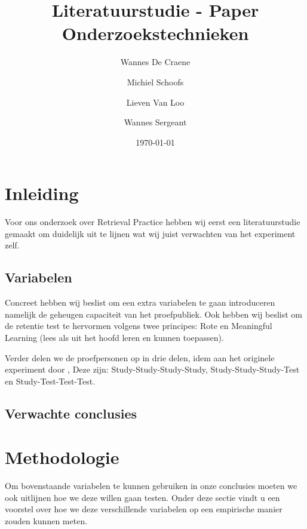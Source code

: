 \documentclass[12pt,a4paper]{article}
\author{Wannes {De Craene} \and Michiel Schoofs \and Lieven {Van Loo} \and Wannes Sergeant}
\title{Literatuurstudie - Paper Onderzoekstechnieken}
\date{\today}
\begin{document}
    
    \maketitle
    
    \tableofcontents

    \newpage
    \section{Inleiding}
    
    Voor ons onderzoek over Retrieval Practice hebben wij eerst een literatuurstudie gemaakt om duidelijk uit te lijnen wat wij juist verwachten van het experiment zelf.
    \subsection{Variabelen}
    Concreet hebben wij beslist om een extra variabelen te gaan introduceren namelijk de geheugen capaciteit van het proefpubliek. Ook hebben wij beslist om de retentie test te hervormen volgens twee principes: Rote en Meaningful Learning (lees als uit het hoofd leren en kunnen toepassen).\\
    \par
	\noindent    
    Verder delen we de proefpersonen op in drie delen, idem aan het originele experiment door \cite{HenryRoediger2006}, Deze zijn: Study-Study-Study-Study, Study-Study-Study-Test  en Study-Test-Test-Test. 
    \subsection{Verwachte conclusies}
    
    \section{Methodologie}
    \label{methodology}
    Om bovenstaande variabelen te kunnen gebruiken in onze conclusies moeten we ook uitlijnen hoe we deze willen gaan testen. Onder deze sectie vindt u een voorstel over hoe we deze verschillende variabelen op een empirische manier zouden kunnen meten.
    
\end{document}
